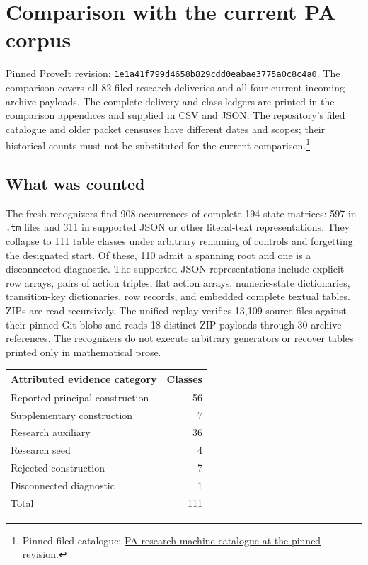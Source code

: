 \section{Comparison with the current PA corpus}
\label{sec:comparison}

Pinned ProveIt revision:
\texttt{1e1a41f799d4658b829cdd0eabae3775a0c8c4a0}. The comparison covers all 82 filed
research deliveries and all four current incoming archive payloads. The
complete delivery and class ledgers are printed in the comparison appendices
and supplied in CSV and JSON. The repository's filed catalogue and older
packet censuses have different dates and scopes; their historical counts
must not be substituted for the current comparison.\footnote{Pinned
filed catalogue: \href{https://github.com/VladimirReshetnikov/ProveIt/blob/1e1a41f799d4658b829cdd0eabae3775a0c8c4a0/Computability/BusyBeaver/Research/PA/docs/MACHINES.md}{PA research machine catalogue at the pinned revision}.}

\subsection{What was counted}

The fresh recognizers find 908 occurrences of complete 194-state matrices:
597 in \texttt{.tm} files and 311 in supported JSON or other literal-text
representations. They collapse to 111 table classes under arbitrary
renaming of controls and forgetting the designated start. Of these, 110
admit a spanning root and one is a disconnected diagnostic. The supported
JSON representations include explicit row arrays, pairs of action triples,
flat action arrays, numeric-state dictionaries, transition-key dictionaries,
row records, and embedded complete textual tables. ZIPs are read recursively. The unified replay verifies 13,109 source files against their pinned Git blobs and reads 18 distinct ZIP payloads through 30 archive references.
The recognizers do not execute arbitrary generators or recover tables
printed only in mathematical prose.

\begin{center}
\begin{tabular}{lr}
\toprule
Attributed evidence category & Classes\\
\midrule
Reported principal construction & 56\\
Supplementary construction & 7\\
Research auxiliary & 36\\
Research seed & 4\\
Rejected construction & 7\\
Disconnected diagnostic & 1\\
\midrule Total & 111\\\bottomrule
\end{tabular}
\end{center}

